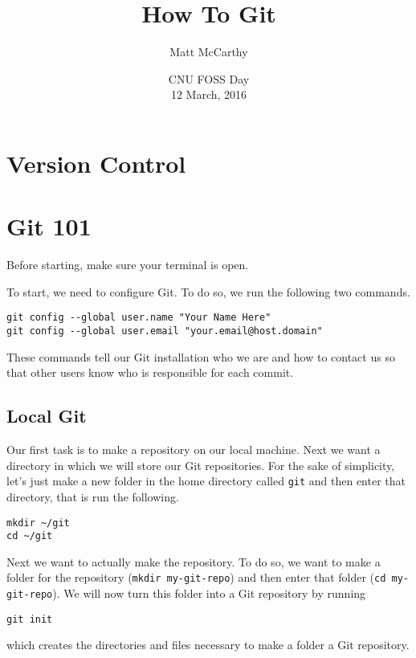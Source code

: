 \documentclass[notitlepage]{simple}
\author{Matt McCarthy}
\title{How To Git}
\date{CNU FOSS Day\\ 12 March, 2016}
\begin{document}
\maketitle

\section{Version Control}


\section{Git 101}

Before starting, make sure your terminal is open.

To start, we need to configure Git.
To do so, we run the following two commands.
\begin{terminal}
	\verb|git config --global user.name "Your Name Here"|\\
	\verb|git config --global user.email "your.email@host.domain"|
\end{terminal}
These commands tell our Git installation who we are and how to contact us so that other users know who is responsible for each commit.

\subsection{Local Git}

Our first task is to make a repository on our local machine.
Next we want a directory in which we will store our Git repositories.
For the sake of simplicity, let's just make a new folder in the home directory called \verb|git| and then enter that directory, that is run the following.
\begin{terminal}
	\verb|mkdir ~/git|\\
	\verb|cd ~/git|
\end{terminal}
Next we want to actually make the repository.
To do so, we want to make a folder for the repository (\verb|mkdir my-git-repo|) and then enter that folder (\verb|cd my-git-repo|).
We will now turn this folder into a Git repository by running
\begin{terminal}
	\verb|git init|
\end{terminal}
which creates the directories and files necessary to make a folder a Git repository.
\end{document}
